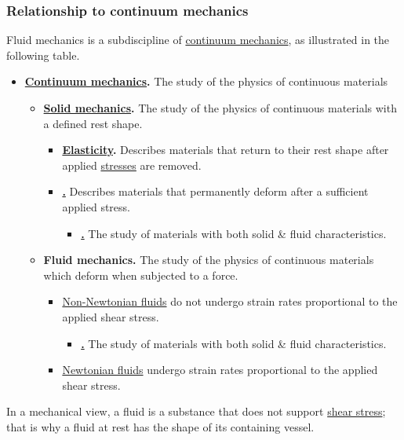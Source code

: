 \documentclass{article}
\begin{document}
\subsubsection{Relationship to continuum mechanics}
Fluid mechanics is a subdiscipline of \href{https://en.wikipedia.org/wiki/Continuum_mechanics}{continuum mechanics}, as illustrated in the following table.
\begin{itemize}
	\item \textbf{\href{https://en.wikipedia.org/wiki/Continuum_mechanics}{Continuum mechanics}.} The study of the physics of continuous materials
	\begin{itemize}
		\item \textbf{\href{https://en.wikipedia.org/wiki/Solid_mechanics}{Solid mechanics}.} The study of the physics of continuous materials with a defined rest shape.
		\begin{itemize}
			\item \textbf{\href{https://en.wikipedia.org/wiki/Elasticity_(physics)}{Elasticity}.} Describes materials that return to their rest shape after applied \href{https://en.wikipedia.org/wiki/Stress_(physics)}{stresses} are removed.
			\item \textbf{\href{https://en.wikipedia.org/wiki/Plasticity_(physics)}.} Describes materials that permanently deform after a sufficient applied stress.
			\begin{itemize}
				\item \textbf{\href{https://en.wikipedia.org/wiki/Rheology}.} The study of materials with both solid \& fluid characteristics.
			\end{itemize}
		\end{itemize}
		\item \textbf{Fluid mechanics.} The study of the physics of continuous materials which deform when subjected to a force.
		\begin{itemize}
			\item \href{https://en.wikipedia.org/wiki/Non-Newtonian_fluid}{Non-Newtonian fluids} do not undergo strain rates proportional to the applied shear stress.
			\begin{itemize}
				\item \textbf{\href{https://en.wikipedia.org/wiki/Rheology}.} The study of materials with both solid \& fluid characteristics.
			\end{itemize}
			\item \href{https://en.wikipedia.org/wiki/Newtonian_fluid}{Newtonian fluids} undergo strain rates proportional to the applied shear stress.
		\end{itemize}
	\end{itemize}
\end{itemize}
In a mechanical view, a fluid is a substance that does not support \href{https://en.wikipedia.org/wiki/Shear_stress}{shear stress}; that is why a fluid at rest has the shape of its containing vessel.
\end{document}
